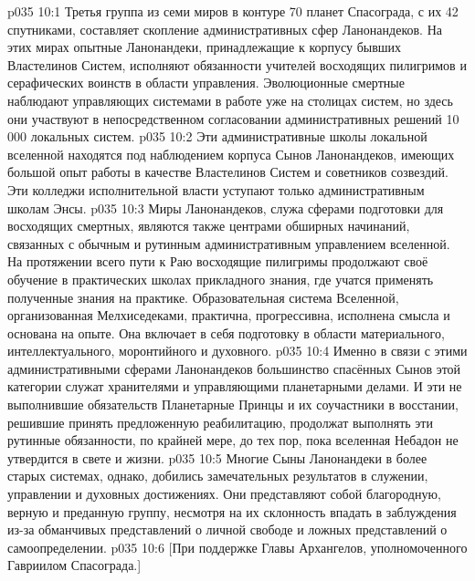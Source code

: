 \vs p035 10:1 Третья группа из семи миров в контуре 70 планет Спасограда, с их 42 спутниками, составляет скопление административных сфер Ланонандеков. На этих мирах опытные Ланонандеки, принадлежащие к корпусу бывших Властелинов Систем, исполняют обязанности учителей восходящих пилигримов и серафических воинств в области управления. Эволюционные смертные наблюдают управляющих системами в работе уже на столицах систем, но здесь они участвуют в непосредственном согласовании административных решений 10\,000 локальных систем.
\vs p035 10:2 Эти административные школы локальной вселенной находятся под наблюдением корпуса Сынов Ланонандеков, имеющих большой опыт работы в качестве Властелинов Систем и советников созвездий. Эти колледжи исполнительной власти уступают только административным школам Энсы.
\vs p035 10:3 Миры Ланонандеков, служа сферами подготовки для восходящих смертных, являются также центрами обширных начинаний, связанных с обычным и рутинным административным управлением вселенной. На протяжении всего пути к Раю восходящие пилигримы продолжают своё обучение в практических школах прикладного знания, где учатся применять полученные знания на практике. Образовательная система Вселенной, организованная Мелхиседеками, практична, прогрессивна, исполнена смысла и основана на опыте. Она включает в себя подготовку в области материального, интеллектуального, моронтийного и духовного.
\vs p035 10:4 \pc Именно в связи с этими административными сферами Ланонандеков большинство спасённых Сынов этой категории служат хранителями и управляющими планетарными делами. И эти не выполнившие обязательств Планетарные Принцы и их соучастники в восстании, решившие принять предложенную реабилитацию, продолжат выполнять эти рутинные обязанности, по крайней мере, до тех пор, пока вселенная Небадон не утвердится в свете и жизни.
\vs p035 10:5 \pc Многие Сыны Ланонандеки в более старых системах, однако, добились замечательных результатов в служении, управлении и духовных достижениях. Они представляют собой благородную, верную и преданную группу, несмотря на их склонность впадать в заблуждения из-за обманчивых представлений о личной свободе и ложных представлений о самоопределении.
\vsetoff
\vs p035 10:6 [При поддержке Главы Архангелов, уполномоченного Гавриилом Спасограда.]
\quizlink

